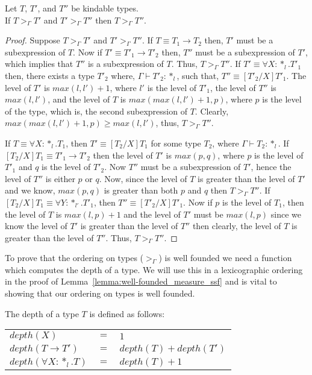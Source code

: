 \begin{lemma}
  Let $T$, $T'$, and $T''$ be kindable types.  \\ If $T >_\Gamma T'$ and 
  $T' >_\Gamma T''$ then $T >_\Gamma T''$.
  \label{lemma:transitivity_ssf}
\end{lemma}
\begin{proof}  
  Suppose $T >_\Gamma T'$ and $T' >_\Gamma T''$.  
  If $T \equiv T_1 \rightarrow T_2$ then,
  $T'$ must be a subexpression of $T$.  Now if $T' \equiv T'_1 \rightarrow T'_2$ 
  then,
  $T''$ must be a subexpression of $T'$, which implies that $T''$ is a subexpression of 
  $T$.  Thus, $T >_\Gamma T''$.
  If $T' \equiv \forall X:*_l.T'_1$ then, there exists a type $T'_2$ where, 
  $\Gamma \vdash T'_2:*_l$, such that, 
  $T'' \equiv [T'_2/X]T'_1$.  The level of $T'$ is $max(l,l')+1$, where $l'$ is the 
  level of $T'_1$, the level of 
  $T''$ is $max(l,l')$, and the level of $T$ is $max(max(l,l')+1,p)$, where $p$ is the 
  level of the type, which is, the second subexpression of $T$.
  Clearly, $max(max(l,l')+1,p) \geq max(l,l')$, thus, $T >_\Gamma T''$.

  If $T \equiv \forall X:*_l.T_1$, then $T' \equiv [T_2/X]T_1$ for some type 
  $T_2$, where $\Gamma \vdash T_2:*_l$.  If
  $[T_2/X]T_1 \equiv T'_1 \rightarrow T'_2$ then the level of $T'$ is $max(p,q)$, where 
  $p$ is the level
  of $T'_1$ and $q$ is the level of $T'_2$.  Now $T''$ must be a subexpression of 
  $T'$, hence the level of $T''$ is either $p$ or $q$.  Now, since
  the level of $T$ is greater than the level of $T'$ and we know, $max(p,q)$ is greater 
  than both $p$ and $q$ then $T >_\Gamma T''$.  If 
  $[T_2/X]T_1 \equiv \forall Y:*_{l'}.T'_1$, then $T'' \equiv [T'_2/X]T'_1$.  
  Now if $p$ is the level of $T_1$, then the level of $T$ is
  $max(l,p)+1$ and the level of $T'$ must be $max(l,p)$ since we know the level of $T'$ is 
  greater than the level of $T''$ then clearly, the level of 
  $T$ is greater than the level of $T''$.  Thus, $T >_\Gamma T''$.
\end{proof}
\noindent
To prove that the ordering on types ($>_\Gamma$) is well founded we need
a function which computes the depth of a type.  We will use this in a
lexicographic ordering in the proof of
Lemma~\ref{lemma:well-founded_measure_ssf} and is vital to showing
that our ordering on types is well founded.

\begin{definition}
  The depth of a type $T$ is defined as follows:
  \begin{center}
    \begin{tabular}{lll}
      $depth(X)$                  & $=$ & $1$\\
      $depth(T \to T')$     & $=$ & $depth(T) + depth(T')$\\
      $depth(\forall X:*_l.T)$ & $=$ & $depth(T) + 1$\\
    \end{tabular}
  \end{center}
\end{definition}

